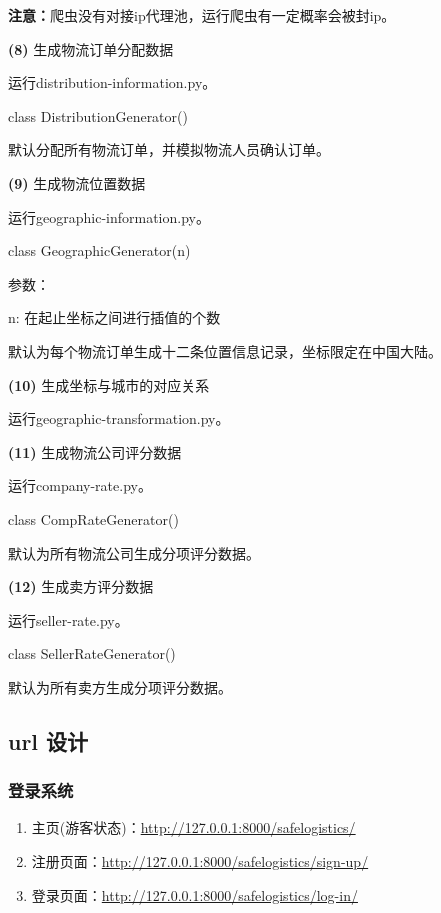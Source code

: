 \documentclass[12pt]{article}
\begin{document}
\noindent \textbf{注意：}爬虫没有对接ip代理池，运行爬虫有一定概率会被封ip。

\noindent \textbf{(8)} 生成物流订单分配数据 \par 
运行distribution-information.py。\par 
class DistributionGenerator() \par 
\noindent 默认分配所有物流订单，并模拟物流人员确认订单。

\noindent \textbf{(9)} 生成物流位置数据 \par 
运行geographic-information.py。\par 
class GeographicGenerator(n) \par 
\noindent 参数：\par 
n: 在起止坐标之间进行插值的个数 \par
\noindent 默认为每个物流订单生成十二条位置信息记录，坐标限定在中国大陆。

\noindent \textbf{(10)} 生成坐标与城市的对应关系 \par
运行geographic-transformation.py。\par 

\noindent \textbf{(11)} 生成物流公司评分数据 \par
运行company-rate.py。\par 
class CompRateGenerator() \par 
\noindent 默认为所有物流公司生成分项评分数据。

\noindent \textbf{(12)} 生成卖方评分数据 \par
运行seller-rate.py。\par 
class SellerRateGenerator() \par 
\noindent 默认为所有卖方生成分项评分数据。

\subsection{url 设计}
\subsubsection{登录系统} \par
\begin{enumerate}
	\item 主页(游客状态)：\url{http://127.0.0.1:8000/safelogistics/}
	\item 注册页面：\url{http://127.0.0.1:8000/safelogistics/sign-up/}
	\item 登录页面：\url{http://127.0.0.1:8000/safelogistics/log-in/} 
\end{enumerate}
\end{document}
